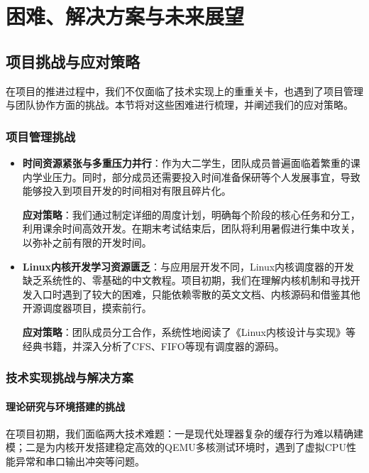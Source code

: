 \section{困难、解决方案与未来展望} \label{sec:difficulties_future}

\subsection{项目挑战与应对策略}

在项目的推进过程中，我们不仅面临了技术实现上的重重关卡，也遇到了项目管理与团队协作方面的挑战。本节将对这些困难进行梳理，并阐述我们的应对策略。

\subsubsection{项目管理挑战}

\begin{itemize}
    \item \textbf{时间资源紧张与多重压力并行}：作为大二学生，团队成员普遍面临着繁重的课内学业压力。同时，部分成员还需要投入时间准备保研等个人发展事宜，导致能够投入到项目开发的时间相对有限且碎片化。
  
    \textbf{应对策略}：我们通过制定详细的周度计划，明确每个阶段的核心任务和分工，利用课余时间高效开发。在期末考试结束后，团队将利用暑假进行集中攻关，以弥补之前有限的开发时间。

    \item \textbf{Linux内核开发学习资源匮乏}：与应用层开发不同，Linux内核调度器的开发缺乏系统性的、零基础的中文教程。项目初期，我们在理解内核机制和寻找开发入口时遇到了较大的困难，只能依赖零散的英文文档、内核源码和借鉴其他开源调度器项目，摸索前行。
   
    \textbf{应对策略}：团队成员分工合作，系统性地阅读了《Linux内核设计与实现》等经典书籍，并深入分析了CFS、FIFO等现有调度器的源码。
\end{itemize}

\subsubsection{技术实现挑战与解决方案}

\paragraph{理论研究与环境搭建的挑战}

在项目初期，我们面临两大技术难题：一是现代处理器复杂的缓存行为难以精确建模；二是为内核开发搭建稳定高效的QEMU多核测试环境时，遇到了虚拟CPU性能异常和串口输出冲突等问题。

